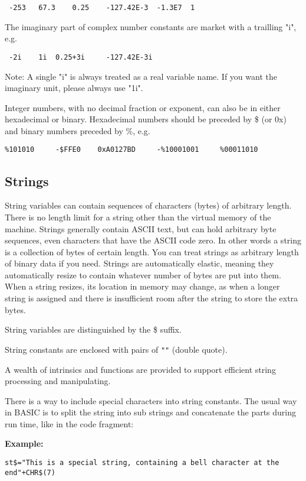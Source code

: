 \begin{verbatim}
 -253 	67.3 	0.25 	-127.42E-3 	-1.3E7 	1
\end{verbatim}

The imaginary part of complex number constants are market with a trailling "i", e.g.

\begin{verbatim}
 -2i 	1i 	0.25+3i     -127.42E-3i
\end{verbatim}
Note: A single "i" is always treated as a real variable name. 
If you want the imaginary unit, please always use "1i".

Integer numbers, with no decimal fraction or exponent, can also be in either 
hexadecimal or binary. Hexadecimal numbers should be preceded by \$ (or 0x) and 
binary numbers preceded by \%, e.g. 

\begin{verbatim}
%101010     -$FFE0    0xA0127BD     -%10001001     %00011010
\end{verbatim}

\subsection{Strings}

String variables can contain sequences of characters (bytes) of arbitrary 
length. There is no length limit for a string other than the virtual memory of
the machine. Strings generally contain ASCII text, but can hold arbitrary byte
sequences, even characters that have the ASCII code zero. In other words a
string is a collection of bytes of certain length. You can treat strings as
arbitrary length of binary data if you need. Strings are automatically
elastic, meaning they automatically resize to contain whatever number of bytes
are put into them. When a string resizes, its location in memory may change, as
when a longer string is assigned and there is insufficient
 room after the string
to store the extra bytes.

String variables are distinguished by the \$ suffix.

String constants are enclosed with pairs of \verb|""| (double quote). 

A wealth of intrinsics and functions are provided to support efficient string
processing and manipulating. 

There is a way to include special characters into string constants. 
The usual way in BASIC is to split the string into sub strings and concatenate 
the parts during run time, like in the code fragment:
\begin{mdframed}[hidealllines=true,backgroundcolor=blue!20]
{\bf Example:}
{\footnotesize
\begin{verbatim}
st$="This is a special string, containing a bell character at the end"+CHR$(7)
\end{verbatim}
}
\end{mdframed}

